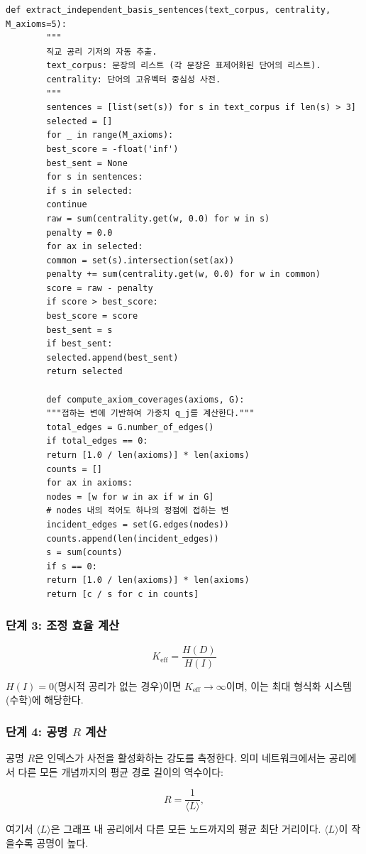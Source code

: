 \documentclass[11pt,a4paper]{article}
\begin{document}
	\begin{lstlisting}[caption={독립 공리 기저 추출 함수}, label={lst:basis}]
		def extract_independent_basis_sentences(text_corpus, centrality, M_axioms=5):
		"""
		직교 공리 기저의 자동 추출.
		text_corpus: 문장의 리스트 (각 문장은 표제어화된 단어의 리스트).
		centrality: 단어의 고유벡터 중심성 사전.
		"""
		sentences = [list(set(s)) for s in text_corpus if len(s) > 3]
		selected = []
		for _ in range(M_axioms):
		best_score = -float('inf')
		best_sent = None
		for s in sentences:
		if s in selected:
		continue
		raw = sum(centrality.get(w, 0.0) for w in s)
		penalty = 0.0
		for ax in selected:
		common = set(s).intersection(set(ax))
		penalty += sum(centrality.get(w, 0.0) for w in common)
		score = raw - penalty
		if score > best_score:
		best_score = score
		best_sent = s
		if best_sent:
		selected.append(best_sent)
		return selected
		
		def compute_axiom_coverages(axioms, G):
		"""접하는 변에 기반하여 가중치 q_j를 계산한다."""
		total_edges = G.number_of_edges()
		if total_edges == 0:
		return [1.0 / len(axioms)] * len(axioms)
		counts = []
		for ax in axioms:
		nodes = [w for w in ax if w in G]
		# nodes 내의 적어도 하나의 정점에 접하는 변
		incident_edges = set(G.edges(nodes))
		counts.append(len(incident_edges))
		s = sum(counts)
		if s == 0:
		return [1.0 / len(axioms)] * len(axioms)
		return [c / s for c in counts]
	\end{lstlisting}
	
	\subsubsection{단계 3: 조정 효율 계산}
	
	\[
	\boxed{
		K_{\mathrm{eff}} = \frac{H(D)}{H(I)}
	}
	\]
	
	\(H(I) = 0\)(명시적 공리가 없는 경우)이면 \(K_{\mathrm{eff}} \to \infty\)이며, 이는 최대 형식화 시스템(수학)에 해당한다.
	
	\subsubsection{단계 4: 공명 \(R\) 계산}
	
	공명 \(R\)은 인덱스가 사전을 활성화하는 강도를 측정한다. 의미 네트워크에서는 공리에서 다른 모든 개념까지의 평균 경로 길이의 역수이다:
	
	\[
	R = \frac{1}{\langle L \rangle},
	\]
	
	여기서 \(\langle L \rangle\)은 그래프 내 공리에서 다른 모든 노드까지의 평균 최단 거리이다. \(\langle L \rangle\)이 작을수록 공명이 높다.
	
\end{document}

